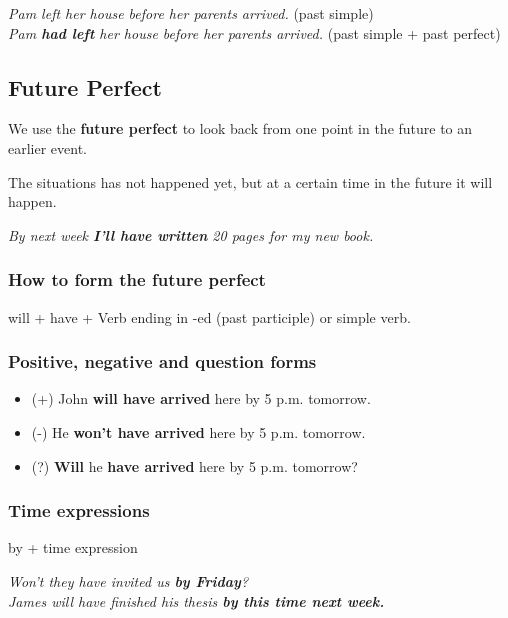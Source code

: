 \documentclass[hidelinks,10pt,a4paper]{article}
\begin{document}
\begin{center}
	\textit{Pam left her house before her parents arrived.} (past simple) \\
	\textit{Pam \textbf{had left} her house before her parents arrived.} (past simple + past perfect)
\end{center}


\subsection{Future Perfect}
We use the \textbf{future perfect} to look back from one point in the future to an earlier event.

The situations has not happened yet, but at a certain time in the future it will happen.

\begin{center}
	\textit{By next week \textbf{I'll have written} 20 pages for my new book. }
\end{center}

\subsubsection{How to form the future perfect}
will + have + Verb ending in -ed (past participle) or simple verb.

\subsubsection{Positive, negative and question forms}
\begin{itemize}
	\item (+) John \textbf{will have arrived} here by 5 p.m. tomorrow.
	\item (-) He \textbf{won't have arrived} here by 5 p.m. tomorrow.
	\item (?) \textbf{Will} he \textbf{have arrived} here by 5 p.m. tomorrow?
\end{itemize}

\subsubsection{Time expressions}
by + time expression

\begin{center}
	\textit{Won't they have invited us \textbf{by Friday}? \\
	James will have finished his thesis \textbf{by this time next week.} }
\end{center}
\end{document}
